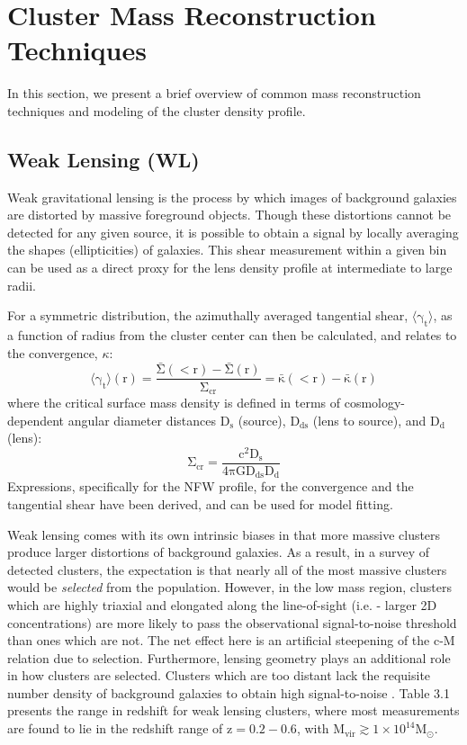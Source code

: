 \section[Reconstruction Techniques]{Cluster Mass Reconstruction Techniques}
In this section, we present a brief overview of common mass reconstruction
techniques and modeling of the cluster density profile.
\subsection{Weak Lensing (WL)}
Weak gravitational lensing is the process by which images of background galaxies
are distorted by massive foreground objects. Though these distortions cannot be
detected for any given source, it is possible to obtain a signal by
locally averaging the shapes (ellipticities) of galaxies. This shear measurement within a given
bin can be used as a direct proxy for the lens density profile at intermediate to large radii.


For a symmetric distribution, the azimuthally averaged tangential shear,
$\mathrm{\langle \gamma_{t} \rangle}$, as a function of radius from the cluster
center can then be calculated, and relates to the convergence, $\kappa$:
\begin{equation}
\mathrm{\langle \gamma_{t} \rangle (r) = \frac{\bar{\Sigma}(<r) -
    \bar{\Sigma}(r)}{\Sigma_{cr}} = \bar{\kappa}(<r) - \bar{\kappa}(r) }
\end{equation}
where the critical surface mass density is defined in terms of
cosmology-dependent angular diameter distances $\mathrm{D_{s}}$ (source),
$\mathrm{D_{ds}}$ (lens to source), and $\mathrm{D_{d}}$ (lens): 
\begin{equation}
\mathrm{\Sigma_{cr} = \frac{c^{2} D_{s}}{4\pi G D_{ds} D_{d}}}
\end{equation}
Expressions, specifically for the NFW profile, for the convergence
\citep{BA96.1} and the tangential shear \citep{WR99.1} have been
derived, and can be used for model fitting.

Weak lensing comes with its own intrinsic biases in that more massive clusters
produce larger distortions of background galaxies. As a result, in a survey of
detected clusters, the expectation is that nearly all of the most massive
clusters would be {\em selected} from the population. However, in the low mass
region, clusters which are highly triaxial and elongated along the line-of-sight (i.e. -
larger 2D concentrations) are more likely to pass the observational
signal-to-noise threshold than ones which are not. The net effect here is an
artificial steepening of the c-M relation due to selection. Furthermore,
lensing geometry plays an additional role in how clusters are
selected. Clusters which are too distant lack the requisite number 
density of background galaxies to obtain high signal-to-noise
\citep{BA01.1}. Table 3.1 presents the range in redshift for weak lensing
clusters, where most measurements are found to lie in the redshift range of
$\mathrm{z=0.2-0.6}$, with $\mathrm{M_{vir} \gtrsim 1\times 10^{14}
  M_{\odot}}$.

